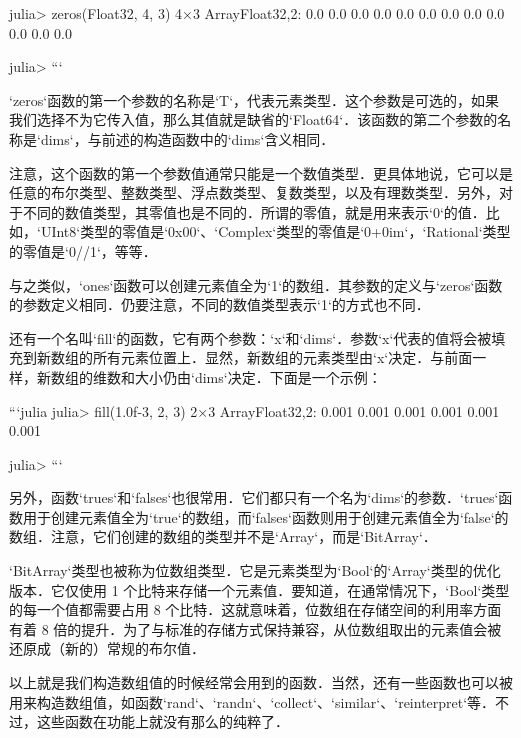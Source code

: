 julia> zeros(Float32, 4, 3)
4×3 Array{Float32,2}:
 0.0  0.0  0.0
 0.0  0.0  0.0
 0.0  0.0  0.0
 0.0  0.0  0.0

julia> 
```

`zeros`函数的第一个参数的名称是`T`，代表元素类型．这个参数是可选的，如果我们选择不为它传入值，那么其值就是缺省的`Float64`．该函数的第二个参数的名称是`dims`，与前述的构造函数中的`dims`含义相同．

注意，这个函数的第一个参数值通常只能是一个数值类型．更具体地说，它可以是任意的布尔类型、整数类型、浮点数类型、复数类型，以及有理数类型．另外，对于不同的数值类型，其零值也是不同的．所谓的零值，就是用来表示`0`的值．比如，`UInt8`类型的零值是`0x00`、`Complex`类型的零值是`0+0im`，`Rational`类型的零值是`0//1`，等等．

与之类似，`ones`函数可以创建元素值全为`1`的数组．其参数的定义与`zeros`函数的参数定义相同．仍要注意，不同的数值类型表示`1`的方式也不同．

还有一个名叫`fill`的函数，它有两个参数：`x`‌和`dims`．参数`x`代表的值将会被填充到新数组的所有元素位置上．显然，新数组的元素类型由`x`决定．与前面一样，新数组的维数和大小仍由`dims`决定．下面是一个示例：

```julia
julia> fill(1.0f-3, 2, 3)
2×3 Array{Float32,2}:
 0.001  0.001  0.001
 0.001  0.001  0.001

julia> 
```

另外，函数`trues`和`falses`也很常用．它们都只有一个名为`dims`的参数．`trues`函数用于创建元素值全为`true`的数组，而`falses`函数则用于创建元素值全为`false`的数组．注意，它们创建的数组的类型并不是`Array`，而是`BitArray`．

`BitArray`类型也被称为位数组类型．它是元素类型为`Bool`的`Array`类型的优化版本．它仅使用 1 个比特来存储一个元素值．要知道，在通常情况下，`Bool`类型的每一个值都需要占用 8 个比特．这就意味着，位数组在存储空间的利用率方面有着 8 倍的提升．为了与标准的存储方式保持兼容，从位数组取出的元素值会被还原成（新的）常规的布尔值．

以上就是我们构造数组值的时候经常会用到的函数．当然，还有一些函数也可以被用来构造数组值，如函数`rand`、`randn`、`collect`、`similar`、`reinterpret`等．不过，这些函数在功能上就没有那么的纯粹了．